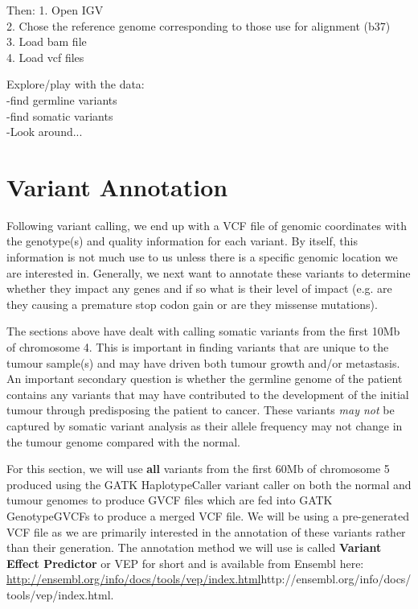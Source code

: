 Then:
   1. Open IGV \\
   2. Chose the reference genome corresponding to those use for alignment (b37) \\
   3. Load bam file \\
   4. Load vcf files

Explore/play with the data: \\ 
   -find germline variants \\
   -find somatic variants \\
   -Look around...

\newpage


\section{Variant Annotation}

Following variant calling, we end up with a VCF file of genomic coordinates with the genotype(s) and quality information for each variant. By itself, this information is not much use to us unless there is a specific genomic location we are interested in. Generally, we next want to annotate these variants to determine whether they impact any genes and if so what is their level of impact (e.g. are they causing a premature stop codon gain or are they missense mutations).

The sections above have dealt with calling somatic variants from the first 10Mb of chromosome 4. This is important in finding variants that are unique to the tumour sample(s) and may have driven both tumour growth and/or metastasis. An important secondary question is whether the germline genome of the patient contains any variants that may have contributed to the development of the initial tumour through predisposing the patient to cancer. These variants \textit{may not} be captured by somatic variant analysis as their allele frequency may not change in the tumour genome compared with the normal.

For this section, we will use \textbf{all} variants from the first 60Mb of chromosome 5 produced using the GATK HaplotypeCaller variant caller on both the normal and tumour genomes to produce GVCF files which are fed into GATK GenotypeGVCFs to produce a merged VCF file. We will be using a pre-generated VCF file as we are primarily interested in the annotation of these variants rather than their generation. The annotation method we will use is called \textbf{Variant Effect Predictor} or VEP for short and is available from Ensembl here: \url{http://ensembl.org/info/docs/tools/vep/index.html}{http://ensembl.org/info/docs/tools/vep/index.html}.

